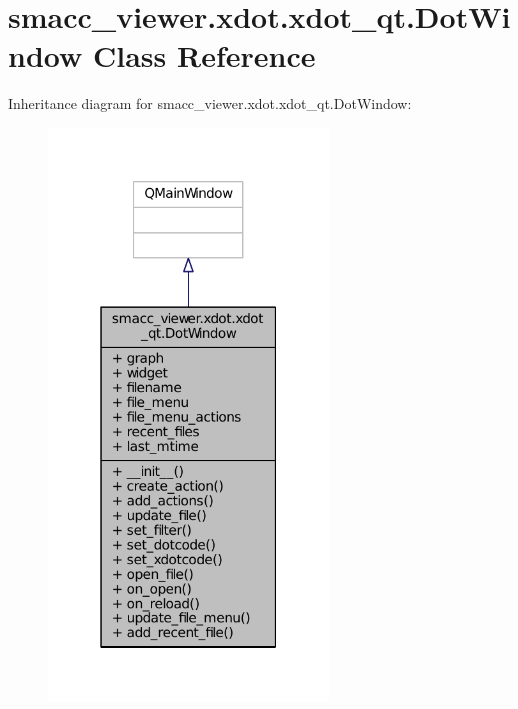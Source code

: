 \hypertarget{classsmacc__viewer_1_1xdot_1_1xdot__qt_1_1DotWindow}{}\section{smacc\+\_\+viewer.\+xdot.\+xdot\+\_\+qt.\+Dot\+Window Class Reference}
\label{classsmacc__viewer_1_1xdot_1_1xdot__qt_1_1DotWindow}


Inheritance diagram for smacc\+\_\+viewer.\+xdot.\+xdot\+\_\+qt.\+Dot\+Window\+:
\nopagebreak
\begin{figure}[H]
\begin{center}
\leavevmode
\includegraphics[width=211pt]{classsmacc__viewer_1_1xdot_1_1xdot__qt_1_1DotWindow__inherit__graph}
\end{center}
\end{figure}


